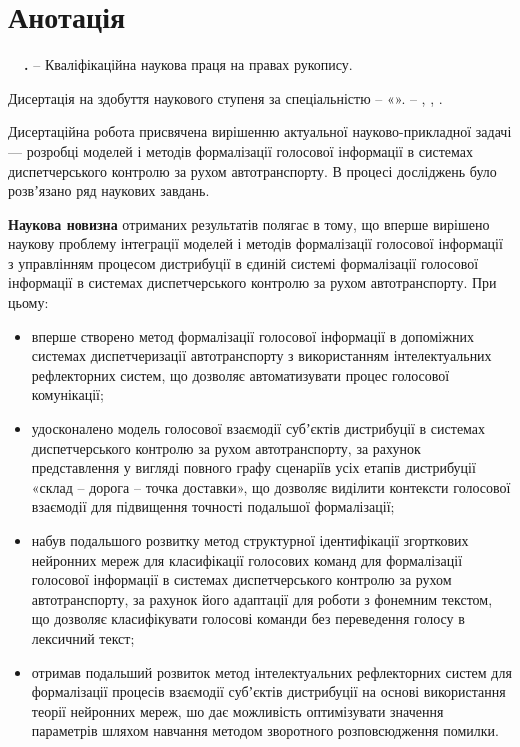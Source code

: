 \chapter*{Анотація}

\textbf{\thesisAuthorLastName~\thesisAuthorInitials\ \thesisTitle.} – Кваліфікаційна наукова праця на
правах рукопису.

Дисертація на здобуття наукового ступеня \thesisDegree за
спеціальністю \thesisSpecialtyNumber – «\thesisSpecialtyTitle». – \thesisOrganizationDone, \thesisCity, \thesisYear.

Дисертаційна робота присвячена вирішенню актуальної науково-прикладної задачі --- розробці моделей і методів формалізації голосової інформації в системах диспетчерського контролю за рухом автотранспорту. В процесі досліджень було розвʼязано ряд наукових завдань.

\textbf{Наукова новизна} отриманих результатів полягає в тому, що вперше вирішено наукову проблему інтеграції моделей і методів формалізації голосової інформації з управлінням процесом дистрибуції в єдиній системі формалізації голосової інформації в системах диспетчерського контролю за рухом автотранспорту. При цьому: 

\begin{itemize}
\item вперше створено метод формалізації голосової інформації в допоміжних системах диспетчеризації автотранспорту з використанням інтелектуальних рефлекторних систем, що дозволяє автоматизувати процес голосової комунікації;
\item удосконалено модель голосової взаємодії субʼєктів дистрибуції в системах диспетчерського контролю за рухом автотранспорту, за рахунок представлення у вигляді повного графу сценаріїв усіх етапів дистрибуції «склад – дорога – точка доставки», що дозволяє виділити контексти голосової взаємодії для підвищення точності подальшої формалізації;
\item набув подальшого розвитку метод структурної ідентифікації згорткових нейронних мереж для класифікації голосових команд для формалізації голосової інформації в системах диспетчерського контролю за рухом автотранспорту, за рахунок його адаптації для роботи з фонемним текстом, що дозволяє класифікувати голосові команди без переведення голосу в лексичний текст;
\item отримав подальший розвиток метод інтелектуальних рефлекторних систем для формалізації процесів взаємодії субʼєктів дистрибуції на основі використання теорії нейронних мереж, шо дає можливість оптимізувати значення параметрів шляхом навчання методом зворотного розповсюдження помилки.
\end{itemize}

